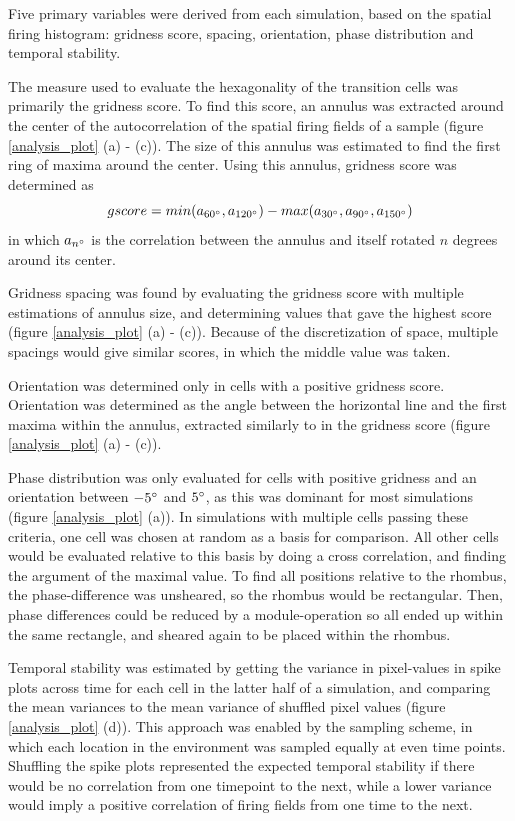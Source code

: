 \documentclass{article}
\begin{document}
    Five primary variables were derived from each simulation, based on the spatial firing histogram: gridness score, spacing, orientation, phase distribution and temporal stability.
    
    The measure used to evaluate the hexagonality of the transition cells was primarily the gridness score. To find this score, an annulus was extracted around the center of the autocorrelation of the spatial firing fields of a sample (figure \ref{analysis_plot} (a) - (c)). The size of this annulus was estimated to find the first ring of maxima around the center. Using this annulus, gridness score was determined as \[gscore = min(a_{60\degree}, a_{120\degree}) - max(a_{30\degree}, a_{90\degree}, a_{150\degree})\] in which \(a_{n\degree}\) is the correlation between the annulus and itself rotated \(n\) degrees around its center.

    Gridness spacing was found by evaluating the gridness score with multiple estimations of annulus size, and determining values that gave the highest score (figure \ref{analysis_plot} (a) - (c)). Because of the discretization of space, multiple spacings would give similar scores, in which the middle value was taken.

    Orientation was determined only in cells with a positive gridness score. Orientation was determined as the angle between the horizontal line and the first maxima within the annulus, extracted similarly to in the gridness score (figure \ref{analysis_plot} (a) - (c)).

    Phase distribution was only evaluated for cells with positive gridness and an orientation between \(-5\degree\) and \(5\degree\), as this was dominant for most simulations (figure \ref{analysis_plot} (a)). In simulations with multiple cells passing these criteria, one cell was chosen at random as a basis for comparison. All other cells would be evaluated relative to this basis by doing a cross correlation, and finding the argument of the maximal value. To find all positions relative to the rhombus, the phase-difference was unsheared, so the rhombus would be rectangular. Then, phase differences could be reduced by a module-operation so all ended up within the same rectangle, and sheared again to be placed within the rhombus.
    
    Temporal stability was estimated by getting the variance in pixel-values in spike plots across time for each cell in the latter half of a simulation, and comparing the mean variances to the mean variance of shuffled pixel values (figure \ref{analysis_plot} (d)). This approach was enabled by the sampling scheme, in which each location in the environment was sampled equally at even time points. Shuffling the spike plots represented the expected temporal stability if there would be no correlation from one timepoint to the next, while a lower variance would imply a positive correlation of firing fields from one time to the next.
\end{document}
